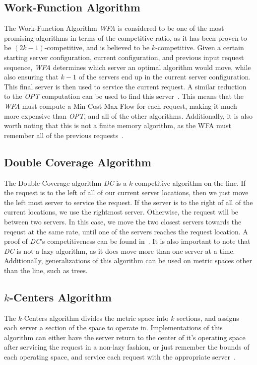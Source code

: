 \subsection*{Work-Function Algorithm}
\label{sec:WFA}
The Work-Function Algorithm \textit{WFA} is considered to be one of the most promising algorithms in terms of the competitive ratio, as it has been proven to be $(2k-1)$-competitive, and is believed to be $k$-competitive. Given a certain starting server configuration, current configuration, and previous input request sequence, \textit{WFA} determines which server an optimal algorithm would move, while also ensuring that $k-1$ of the servers end up in the current server configuration. This final server is then used to service the current request. A similar reduction to the \textit{OPT} computation can be used to find this server~\cite{WFA2009}. This means that the \textit{WFA} must compute a Min Cost Max Flow for each request, making it much more expensive than \textit{OPT}, and all of the other algorithms. Additionally, it is also worth noting that this is not a finite memory algorithm, as the WFA must remember all of the previous requests~\cite{MAXMAX2005}. 

\subsection*{Double Coverage Algorithm}
\label{sec:DC}
The Double Coverage algorithm \textit{DC} is a $k$-competitive algorithm on the line. If the request is to the left of all of our current server locations, then we just move the left most server to service the request. If the server is to the right of all of the current locations, we use the rightmost server. Otherwise, the request will be between two servers. In this case, we move the two closest servers towards the reqeust at the same rate, until one of the servers reaches the request location. A proof of \textit{DC}'s competitiveness can be found in~\cite{OnlineComp1998}. It is also important to note that \textit{DC} is not a lazy algorithm, as it does move more than one server at a time. Additionally, generalizations of this algorithm can be used on metric spaces other than the line, such as trees.

\subsection*{$k$-Centers Algorithm}
\label{sec:KC}
The $k$-Centers algorithm divides the metric space into $k$ sections, and assigns each server a section of the space to operate in. Implementations of this algorithm can either have the server return to the center of it's operating space after servicing the request in a non-lazy fashion, or just remember the bounds of each operating space, and service each request with the appropriate server~\cite{bij2016}.